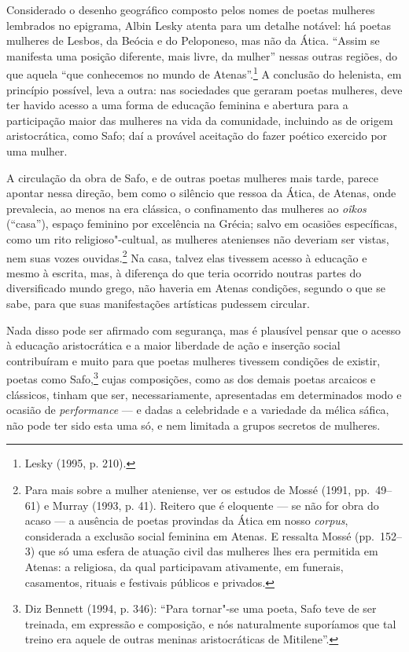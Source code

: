 Considerado o desenho geográfico composto pelos nomes de poetas mulheres
lembrados no epigrama, Albin Lesky atenta para um detalhe
notável: há poetas mulheres de Lesbos, da Beócia e do Peloponeso, mas não da
Ática. “Assim se manifesta uma posição diferente, mais livre, da mulher”
nessas outras regiões, do que aquela “que conhecemos no mundo de Atenas”.\footnote{ Lesky (1995, p. 210).} A
conclusão do helenista, em princípio possível, leva a outra: nas sociedades
que geraram poetas mulheres, deve ter havido acesso a uma forma de educação
feminina e abertura para a participação maior das mulheres na vida da
comunidade, incluindo as de origem aristocrática, como Safo; daí a provável
aceitação do fazer poético exercido por uma mulher.

A circulação da obra de Safo, e de outras poetas mulheres mais tarde, parece
apontar nessa direção, bem como o silêncio que ressoa da Ática, de Atenas, onde
prevalecia, ao menos na era clássica, o confinamento das mulheres ao \textit{oîkos} (“casa”), espaço
feminino por excelência na Grécia; salvo em ocasiões específicas, como um rito
religioso"-cultual, as mulheres atenienses não deveriam ser vistas, nem suas
vozes ouvidas.\footnote{ Para mais sobre a mulher ateniense, ver os estudos de
Mossé (1991, pp.~49--61) e Murray (1993, p. 41). Reitero que é eloquente --- se
não for obra do acaso --- a ausência de poetas provindas da Ática em nosso
\textit{corpus}, considerada a exclusão social feminina em Atenas. E ressalta
Mossé (pp.~152--3) que só uma esfera de atuação civil das mulheres lhes era
permitida em Atenas: a religiosa, da qual participavam ativamente, em funerais,
casamentos, rituais e festivais públicos e privados.} Na casa, talvez elas
tivessem acesso à educação e mesmo à escrita, mas, à diferença do que teria
ocorrido noutras partes do diversificado mundo grego, não haveria em Atenas
condições, segundo o que se sabe, para que suas manifestações artísticas
pudessem circular.

Nada disso pode ser afirmado com segurança, mas é plausível pensar que o acesso
à educação aristocrática e a maior liberdade de ação e inserção social
contribuíram e muito para que poetas mulheres tivessem condições de existir,
poetas como Safo,\footnote{ Diz Bennett (1994, p. 346):
“Para tornar"-se uma poeta, Safo teve de ser treinada, em expressão
e composição, e nós naturalmente suporíamos que tal treino era aquele de outras
meninas aristocráticas de Mitilene”.} cujas composições, como as dos demais
poetas arcaicos e clássicos, tinham que ser, necessariamente, apresentadas em
determinados modo e ocasião de \textit{performance} --- e dadas a celebridade e a variedade da mélica sáfica, não pode ter sido esta uma só, e nem limitada
a grupos secretos de mulheres. 

